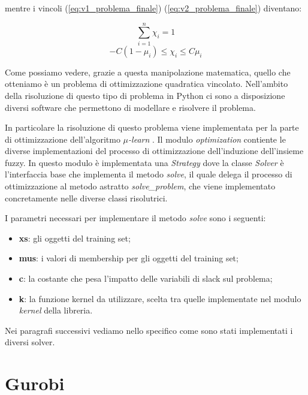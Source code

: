 \documentclass[a4paper,12pt]{report}
\begin{document}
\noindent mentre i vincoli (\ref{eq:v1_problema_finale}) (\ref{eq:v2_problema_finale}) diventano:

\begin{equation}
    \displaystyle\sum_{i=1}^{n}\chi_i = 1
    \label{eq:v1_problema_finale_2}
\end{equation}
\begin{equation}
    -C(1-\mu_i) \le \chi_i \le C\mu_i
    \label{eq:v2_problema_finale_2}
\end{equation}

\noindent Come possiamo vedere, grazie a questa manipolazione matematica, quello che otteniamo è un problema di ottimizzazione quadratica vincolato.
Nell'ambito della risoluzione di questo tipo di problema in Python ci sono a disposizione diversi software che permettono di modellare e risolvere il problema.

In particolare la risoluzione di questo problema viene implementata per la parte di ottimizzazione dell'algoritmo \textit{$\mu$-learn} \cite{mulearn_documentation}. Il modulo \textit{optimization} contiente le diverse implementazioni del processo di ottimizzazione dell'induzione dell'insieme fuzzy. In questo modulo è implementata una \textit{Strategy} \cite{strategy_pattern} dove la classe \textit{Solver} è l'interfaccia base che implementa il metodo \textit{solve}, il quale delega il processo di ottimizzazione al metodo astratto \textit{solve\_problem}, che viene implementato concretamente nelle diverse classi risolutrici.

I parametri necessari per implementare il metodo \textit{solve} sono i seguenti: 
\begin{itemize}
    \item \textbf{xs}: gli oggetti del training set;
    \item \textbf{mus}: i valori di membership per gli oggetti del training set;
    \item \textbf{c}: la costante che pesa l'impatto delle variabili di slack sul problema;
    \item \textbf{k}: la funzione kernel da utilizzare, scelta tra quelle implementate nel modulo \textit{kernel} della libreria.
\end{itemize}

\bigskip

\noindent Nei paragrafi successivi vediamo nello specifico come sono stati implementati i diversi solver.

\section{Gurobi}
\end{document}
